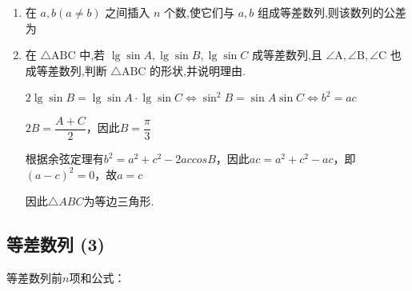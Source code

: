 \begin{enumerate}
    \begin{jieda}
        由题可知, $a + b = 1 + {11} = {12},1 < a < b < {11}$ ,
        所以有 $\dfrac{1}{a} + \dfrac{25}{b} = \left( {\dfrac{a}{12} + \dfrac{b}{12}}\right) \left( {\dfrac{1}{a} + \frac{25}{b}}\right)  = \dfrac{1}{12} + \dfrac{25}{12} + \dfrac{b}{12a} + \dfrac{25a}{12b} \geq  \dfrac{13}{6} + 2\sqrt{\dfrac{b}{12a} \times  \dfrac{25a}{12b}} = 3$ ,
        当且仅当 $\dfrac{b}{12a} = \dfrac{25a}{12b}$ ,即 $b = {10},a = 2$ 时等号成立,
        此时 $a,b$ 满足 $1 < a < b < {11},m = 9$ ,所以 $\dfrac{1}{a} + \dfrac{25}{b}$ 的最小值是 3 .
    \end{jieda}
    \item 在 $a,b\left(a \neq  b\right)$ 之间插入 $n$ 个数,使它们与 $a,b$ 组成等差数列,则该数列的公差为

    \item 在 $\bigtriangleup \mathrm{{ABC}}$ 中,若 $\lg \sin A,\lg \sin B,\lg \sin C$ 成等差数列,且 $\angle \mathrm{A},\angle \mathrm{B},\angle \mathrm{C}$ 也成等差数列,判断 $\bigtriangleup  \mathrm{{ABC}}$ 的形状,并说明理由.
    \begin{jieda}
        $2\lg \sin B = \lg \sin A \cdot \lg \sin C \Longleftrightarrow {\sin }^{2}B = \sin A\sin C \Longleftrightarrow b^2 = ac$

        $2B = \dfrac{A+C}{2}$，因此$B = \dfrac{\pi}{3}$

        根据余弦定理有$b^2 = a^2+c^2-2accosB$，因此$ac = a^2+c^2-ac$，即$(a-c)^2 = 0$，故$a = c$
        
        因此$\triangle ABC$为等边三角形.
        
    \end{jieda}
\end{enumerate}

\clearpage

\subsection*{等差数列 (3)}


等差数列前$n$项和公式：

